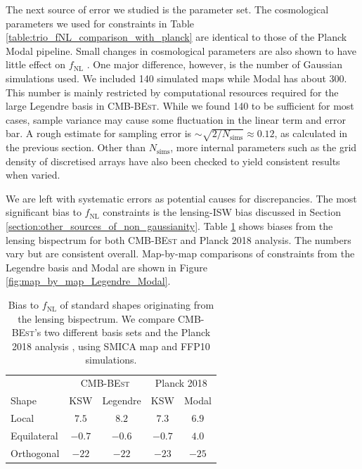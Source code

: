 The next source of error we studied is the parameter set. The cosmological parameters we used for constraints in Table \ref{table:trio_fNL_comparison_with_planck} are identical to those of the Planck Modal pipeline. Small changes in cosmological parameters are also shown to have little effect on $f_\text{NL}$ \cite{PlanckCollaboration2015,PlanckCollaboration2018}. One major difference, however, is the number of Gaussian simulations used. We included 140 simulated maps while Modal has about 300. This number is mainly restricted by computational resources required for the large Legendre basis in \textsc{CMB-BEst}. While we found 140 to be sufficient for most cases, sample variance may cause some fluctuation in the linear term and error bar. A rough estimate for sampling error is $\sim \sqrt{2/N_\text{sims}} \approx 0.12$, as calculated in the previous section. Other than $N_\text{sims}$, more internal parameters such as the grid density of discretised arrays have also been checked to yield consistent results when varied. 

We are left with systematic errors as potential causes for discrepancies. The most significant bias to $f_\text{NL}$ constraints is the lensing-ISW bias discussed in Section \ref{section:other_sources_of_non_gaussianity}. Table \ref{table:trio_lensing_bias_comparison_with_planck} shows biases from the lensing bispectrum \cite{Lewis2011lensing} for both \textsc{CMB-BEst} and Planck 2018 analysis. The numbers vary but are consistent overall. Map-by-map comparisons of constraints from the Legendre basis and Modal are shown in Figure \ref{fig:map_by_map_Legendre_Modal}. 

\begin{table}[h]
	\caption{Bias to $f_\text{NL}$ of standard shapes originating from the lensing bispectrum. We compare \textsc{CMB-BEst}'s two different basis sets and the Planck 2018 analysis \cite{PlanckCollaboration2018}, using SMICA map and FFP10 simulations. }
	\centering
	\label{table:trio_lensing_bias_comparison_with_planck}
	\renewcommand{\arraystretch}{1.5} 
	\begin{tabular}{lcccc}
		\toprule
		& \multicolumn{2}{c}{\textsc{CMB-BEst}} & \multicolumn{2}{c}{Planck 2018} \\ \cmidrule(lr){2-3} \cmidrule(lr){4-5}
		Shape & KSW &  Legendre &  KSW &  Modal \\
		\midrule
		
		Local & $7.5$ & $8.2$ & $7.3$ & $6.9$ \\
		Equilateral & $-0.7$ & $-0.6$ & $-0.7$ & $4.0$\\
		Orthogonal & $-22$ & $-22$ & $-23$ & $-25$ \\
		\bottomrule
	\end{tabular}
\end{table}

